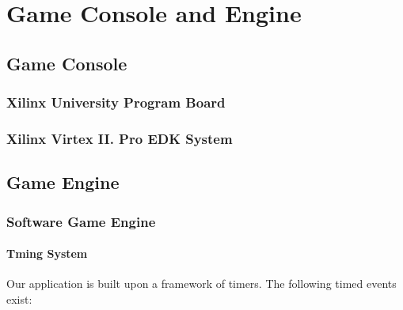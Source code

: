 \documentclass[11pt,letter,oneside]{report}
\begin{document}
\chapter{Game Console and Engine}

\section{Game Console}
\subsection{Xilinx University Program Board}
\subsection{Xilinx Virtex II. Pro EDK System}

\section{Game Engine }
\subsection{Software Game Engine}
\subsubsection{Tming System}
Our application is built upon a framework of timers.
The following timed events exist:
\end{document}
